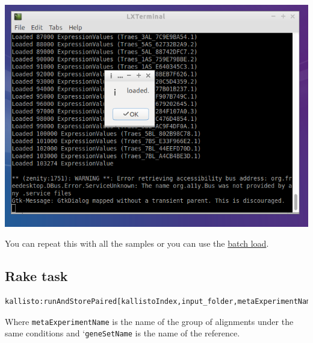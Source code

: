 \begin{enumerate}
  \includegraphics{images/RunKallisto08.png}
\end{enumerate}

You can repeat this with all the samples or you can use the
\href{RunKallistoBatch}{batch load}.

\subsection{Rake task}\label{rake-task}

\begin{lstlisting}[language=sh]
kallisto:runAndStorePaired[kallistoIndex,input_folder,metaExperimentName,geneSetName]
\end{lstlisting}

Where \lstinline!metaExperimentName! is the name of the group of
alignments under the same conditions and `\lstinline!geneSetName! is the
name of the reference.
